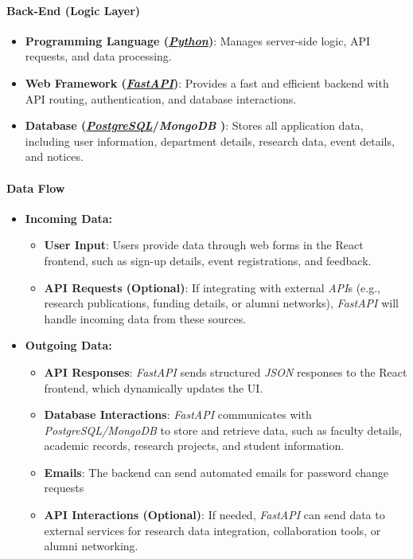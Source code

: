 \documentclass[11pt]{article}
\newcommand{\FastAPI}{\href{https://fastapi.tiangolo.com/}{\textbf{{\textcolor{fastAPIColor}{\textit{FastAPI}}}}}}
\newcommand{\PostgreSQL}{\href{https://www.postgresql.org/}{\textbf{{\textcolor{postgresColor}{\textit{PostgreSQL}}}}}}
\newcommand{\Python}{\href{https://www.python.org/}{\textbf{{\textcolor{pythonColor}{\textit{Python}}}}}}
\begin{document}
\paragraph{Back-End (Logic Layer)}
\begin{itemize}
    \item \textbf{Programming Language (\Python)}: Manages server-side logic, API requests, and data processing.
    \item \textbf{Web Framework (\FastAPI)}: Provides a fast and efficient backend with API routing, authentication, and database interactions.
    \item \textbf{Database (\PostgreSQL/\textbf{\textit{MongoDB}} )}: Stores all application data, including user information, department details, research data, event details, and notices.
\end{itemize}

\paragraph{Data Flow}
\begin{itemize}
    \item \textbf{Incoming Data:}
    \begin{itemize}
        \item \textbf{User Input}: Users provide data through web forms in the React frontend, such as sign-up details, event registrations, and feedback.
        \item \textbf{API Requests (Optional)}: If integrating with external \textit{API}s (e.g., research publications, funding details, or alumni networks), \textit{FastAPI} will handle incoming data from these sources.
    \end{itemize}
    \item \textbf{Outgoing Data:}
    \begin{itemize}
        \item \textbf{API Responses}: \textit{FastAPI} sends structured \textit{JSON} responses to the React frontend, which dynamically updates the UI.
        \item \textbf{Database Interactions}: \textit{FastAPI} communicates with \textit{PostgreSQL/MongoDB} to store and retrieve data, such as faculty details, academic records, research projects, and student information.
        \item \textbf{Emails}: The backend can send automated emails for password change requests
        \item \textbf{API Interactions (Optional)}: If needed, \textit{FastAPI} can send data to external services for research data integration, collaboration tools, or alumni networking.
    \end{itemize}
\end{itemize}
\end{document}
